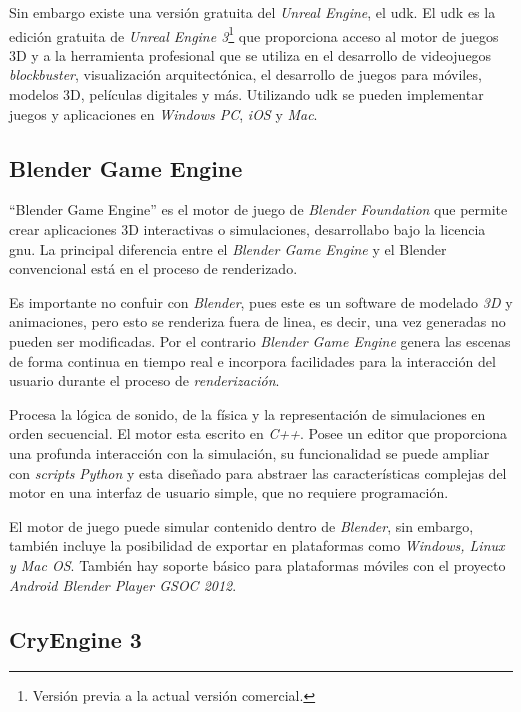 Sin embargo existe una versión gratuita del \textit{Unreal Engine}, el
\Gls{udk}. El \Gls{udk} es la edición gratuita de \textit{Unreal Engine
    3}\footnote{Versión previa a la actual versión comercial.} que proporciona
acceso al motor de juegos 3D y a la herramienta profesional que se utiliza en el
desarrollo de videojuegos \textit{blockbuster}, visualización arquitectónica, el
desarrollo de juegos para móviles, modelos 3D, películas digitales y más.
Utilizando \Gls{udk} se pueden implementar juegos y aplicaciones en
\textit{Windows PC}, \textit{iOS} y \textit{Mac}.


\subsection{Blender Game Engine}

\enquote{Blender Game Engine} es el motor de juego de \textit{Blender
    Foundation} que permite crear aplicaciones 3D interactivas o simulaciones,
desarrollabo bajo la licencia \Gls{gnu}. La principal diferencia entre el
\textit{Blender Game Engine} y el Blender convencional está en el proceso de
renderizado\cite{blender}.

Es importante no confuir con \textit{Blender}, pues este es un software de
modelado \textit{3D} y animaciones, pero esto se renderiza fuera de linea, es
decir, una vez generadas no pueden ser modificadas. Por el contrario
\textit{Blender Game Engine} genera las escenas de forma continua en tiempo real
e incorpora facilidades para la interacción del usuario durante el proceso de
\textit{renderización}\cite{blender}.

Procesa la lógica de sonido, de la física y la representación de simulaciones en
orden secuencial. El motor esta escrito en \textit{C++}. Posee un editor que
proporciona una profunda interacción con la simulación, su funcionalidad se
puede ampliar con \textit{scripts} \textit{Python} y esta diseñado para abstraer
las características complejas del motor en una interfaz de usuario simple, que
no requiere programación\cite{blender}.

El motor de juego puede simular contenido dentro de \textit{Blender}, sin
embargo, también incluye la posibilidad de exportar en plataformas como
\textit{Windows, Linux y Mac OS}. También hay soporte básico para plataformas
móviles con el proyecto \textit{Android Blender Player GSOC 2012}.

\subsection{CryEngine 3}

